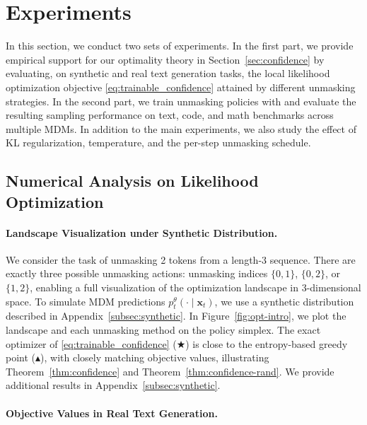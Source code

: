 \section{Experiments}\label{sec:exp}
In this section, we conduct two sets of experiments. In the first part, we provide empirical support for our optimality theory in Section~\ref{sec:confidence} by evaluating, on synthetic and real text generation tasks, the local likelihood optimization objective \eqref{eq:trainable_confidence} attained by different unmasking strategies. In the second part, we train unmasking policies with \alg{} and evaluate the resulting sampling performance on text, code, and math benchmarks across multiple MDMs. In addition to the main experiments, we also study the effect of KL regularization, temperature, and the per-step unmasking schedule.

\subsection{Numerical Analysis on Likelihood Optimization}\label{subsec:numerical-analysis}

\paragraph{Landscape Visualization under Synthetic Distribution.}

We consider the task of unmasking 2 tokens from a length-3 sequence. There are exactly three possible unmasking actions: unmasking indices $\{0,1\}$, $\{0,2\}$, or $\{1,2\}$, enabling a full visualization of the optimization landscape in 3-dimensional space. To simulate MDM predictions $p_t^\theta(\cdot \mid \bm x_t)$, we use a synthetic distribution described in Appendix~\ref{subsec:synthetic}. In Figure~\ref{fig:opt-intro}, we plot the landscape and each unmasking method on the policy simplex. The exact optimizer of \eqref{eq:trainable_confidence} ($\bigstar$) is close to the entropy-based greedy point ($\blacktriangle$), with closely matching objective values, illustrating Theorem~\ref{thm:confidence} and Theorem~\ref{thm:confidence-rand}. We provide additional results in Appendix~\ref{subsec:synthetic}. 

\paragraph{Objective Values in Real Text Generation.} 


